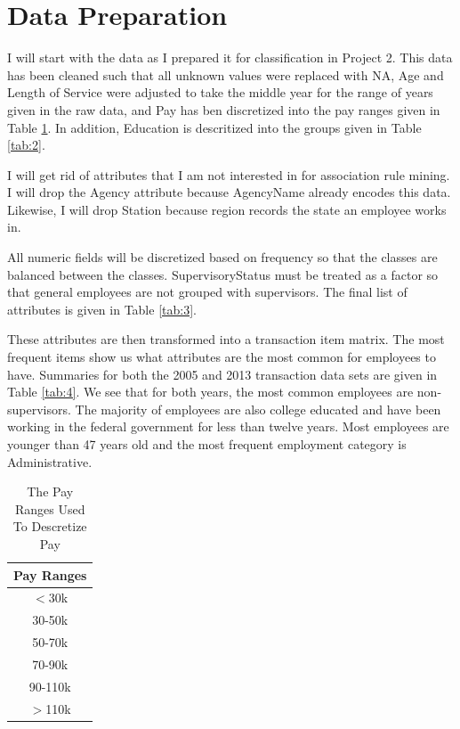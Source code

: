 \documentclass{article}
\begin{document}
\section{Data Preparation}
I will start with the data as I prepared it for classification in Project 2. This data has been cleaned such that all unknown values were replaced with NA, Age and Length of Service were adjusted to take the middle year for the range of years given in the raw data, and Pay has ben discretized into the pay ranges given in Table \ref{tab:1}. In addition, Education is descritized into the groups given in Table \ref{tab:2}.
\par
I will get rid of attributes that I am not interested in for association rule mining. I will drop the Agency attribute because AgencyName already encodes this data. Likewise, I will drop Station because region records the state an employee works in.
\par
All numeric fields will be discretized based on frequency so that the classes are balanced between the classes. SupervisoryStatus must be treated as a factor so that general employees are not grouped with supervisors. The final list of attributes is given in Table \ref{tab:3}.
\par
These attributes are then transformed into a transaction item matrix. The most frequent items show us what attributes are the most common for employees to have. Summaries for both the 2005 and 2013 transaction data sets are given in Table \ref{tab:4}. We see that for both years, the most common employees are non-supervisors. The majority of employees are also college educated and have been working in the federal government for less than twelve years. Most employees are younger than 47 years old and the most frequent employment category is Administrative.

    \begin{center}
        \begin{table}
            \centering
            \begin{tabular}{ |c| }
                \hline
                Pay Ranges \\
                \hline
                $<$30k \\
                30-50k \\
                50-70k \\
                70-90k \\
                90-110k \\
                $>$110k \\
                \hline
            \end{tabular}
            \caption{The Pay Ranges Used To Descretize Pay}
            \label{tab:1}
        \end{table}
    \end{center}
\end{document}
